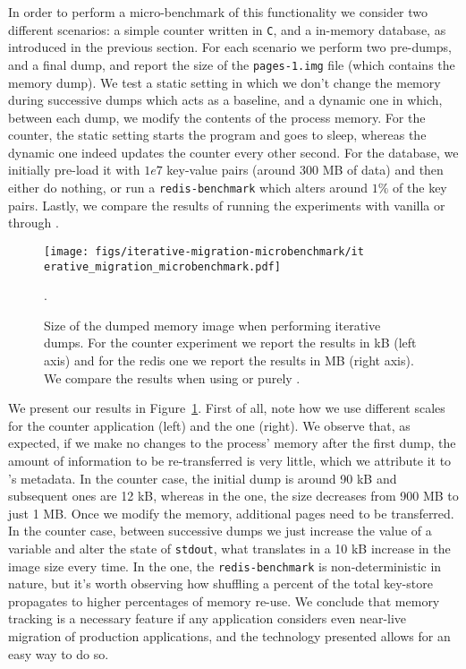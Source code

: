 In order to perform a micro-benchmark of this functionality we consider two
different scenarios: a simple counter written in \texttt{C}, and a \redis
in-memory database, as introduced in the previous section.
For each scenario we perform two pre-dumps, and a final dump, and report the
size of the \texttt{pages-1.img} file (which contains the memory dump).
We test a static setting in which we don't change the memory during successive
dumps which acts as a baseline, and a dynamic one in which, between each dump,
we modify the contents of the process memory.
For the counter, the static setting starts the program and goes to sleep,
whereas the dynamic one indeed updates the counter every other second.
For the database, we initially pre-load it with $1e7$ key-value pairs (around
300 MB of data) and then either do nothing, or run a \texttt{redis-benchmark}
which alters around $1\%$ of the key pairs.
Lastly, we compare the results of running the experiments with vanilla \criu or
through \runc.

\begin{figure}[h!]
    \centering

    \texttt{[image: figs/iterative-migration-microbenchmark/it
        erative\_migration\_microbenchmark.pdf]}
    \caption[Size of the memory image for iterative dumps.]{Size of the dumped
        memory image when performing iterative dumps.
        For the counter experiment we report the results in kB (left axis) and for the
        redis one we report the results in MB (right axis).
        We compare the results when using \runc or purely \criu.
        \label{fig:iterative-migration-microbenchmark}}.
\end{figure}

We present our results in Figure~\ref{fig:iterative-migration-microbenchmark}.
First of all, note how we use different scales for the counter application
(left) and the \redis one (right).
We observe that, as expected, if we make no changes to the process' memory
after the first dump, the amount of information to be re-transferred is very
little, which we attribute it to \criu's metadata.
In the counter case, the initial dump is around 90 kB and subsequent ones are
12 kB, whereas in the \redis one, the size decreases from 900 MB to just 1 MB.
Once we modify the memory, additional pages need to be transferred.
In the counter case, between successive dumps we just increase the value of a
variable and alter the state of \texttt{stdout}, what translates in a 10 kB
increase in the image size every time.
In the \redis one, the \texttt{redis-benchmark} is non-deterministic in nature,
but it's worth observing how shuffling a percent of the total key-store
propagates to higher percentages of memory re-use.
We conclude that memory tracking is a necessary feature if any application
considers even near-live migration of production applications, and the
technology presented allows for an easy way to do so.

